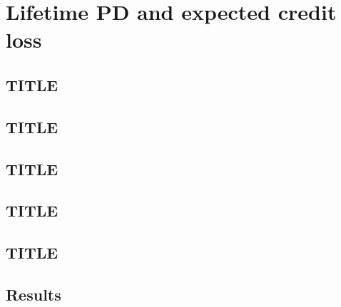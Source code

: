 \chapter{Lifetime PD and expected credit loss}
\label{ch:provisions}


\section{TITLE}
\label{sec:m10}


\section{TITLE}
\label{sec:m11}


\section{TITLE}
\label{sec:m12}


\section{TITLE}
\label{sec:m13}


\section{TITLE}
\label{sec:m33}


\section{Results}
\label{sec:results-provisions}

